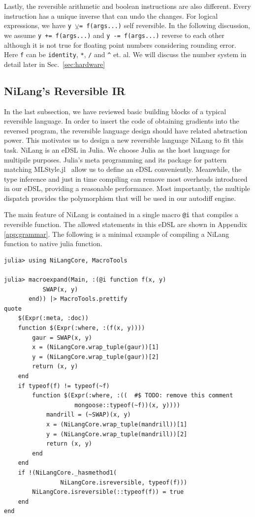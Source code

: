 \documentclass[aps,twocolumn,longbibliography,english,superscriptaddress]{revtex4-1}
\newcommand{\<}{\langle}
\renewcommand{\>}{\rangle}
\newcommand{\Sec}[1]{Sec.~\ref{#1}}
\newcommand{\App}[1]{Appendix \ref{#1}}
\theoremstyle{definition}\newtheorem{definition}{\textit{Definition}}
\begin{document}
Lastly, the reversible arithmetic and boolean instructions are also different. Every instruction has a unique inverse that can undo the changes.
For logical expressions, we have \texttt{y $\veebar$= f(args...)} self reversible.
In the following discussion, we assume \texttt{y += f(args...)} and \texttt{y -= f(args...)} reverse to each other although it is not true for floating point numbers considering rounding error. Here \texttt{f} can be \texttt{identity}, \texttt{*}, \texttt{/} and \texttt{\^} et. al.
We will discuss the number system in detail later in \Sec{sec:hardware}

\subsection{NiLang's Reversible IR}
In the last subsection, we have reviewed basic building blocks of a typical reversible language. In order to insert the code of obtaining gradients into the reversed program, the reversible language design should have related abstraction power.
This motivates us to design a new reversible language NiLang to fit this task.
NiLang is an eDSL in Julia. We choose Julia as the host language for multipile purposes. Julia's meta programming and its package for pattern matching MLStyle.jl~\cite{MLStyle} allow us to define an eDSL conveniently. Meanwhile, the type inference and just in time compiling can remove most overheads introduced in our eDSL, providing a reasonable performance. Most importantly, the multiple dispatch provides the polymorphism that will be used in our autodiff engine.

The main feature of NiLang is contained in a single macro \texttt{@i} that compiles a reversible function.
The allowed statements in this eDSL are shown in \App{app:grammar}.
The following is a minimal example of compiling a NiLang function to native julia function.

\begin{minipage}{.44\textwidth}
\begin{lstlisting}
julia> using NiLangCore, MacroTools

julia> macroexpand(Main, :(@i function f(x, y)
           SWAP(x, y)
       end)) |> MacroTools.prettify
quote
    $(Expr(:meta, :doc))
    function $(Expr(:where, :(f(x, y))))
        gaur = SWAP(x, y)
        x = (NiLangCore.wrap_tuple(gaur))[1]
        y = (NiLangCore.wrap_tuple(gaur))[2]
        return (x, y)
    end
    if typeof(f) != typeof(~f)
        function $(Expr(:where, :((  #$ TODO: remove this comment
                    mongoose::typeof(~f))(x, y))))
            mandrill = (~SWAP)(x, y)
            x = (NiLangCore.wrap_tuple(mandrill))[1]
            y = (NiLangCore.wrap_tuple(mandrill))[2]
            return (x, y)
        end
    end
    if !(NiLangCore._hasmethod1(
                NiLangCore.isreversible, typeof(f)))
        NiLangCore.isreversible(::typeof(f)) = true
    end
end
\end{lstlisting}
\end{minipage}
\end{document}

